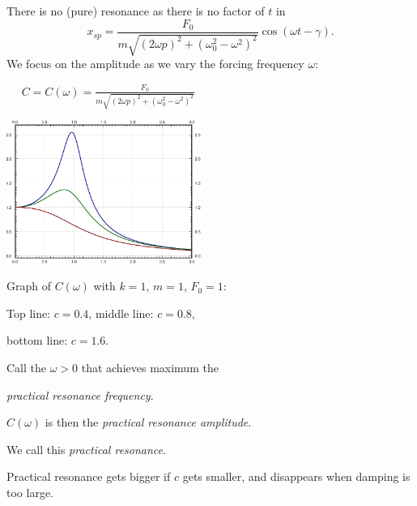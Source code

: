 \documentclass[10pt,aspectratio=169]{beamer}
\begin{document}
\begin{frame}
There is no (pure) resonance as there is no factor of $t$ in
\[
x_{sp} = 
\frac{F_0}{m \sqrt{{(2\omega p)}^2+{(\omega_0^2-\omega^2)}^2}} 
\cos ( \omega t - \gamma ) .
\]
\pause
We focus on the amplitude as we vary the forcing frequency $\omega$:

\medskip

~~
$\displaystyle
C = C(\omega) =
\frac{F_0}{m \sqrt{{(2\omega p)}^2+{(\omega_0^2-\omega^2)}^2}} 
$
\pause
\vspace*{-0.5in}

\hfill
\includegraphics[width=2.5in]{../figures/3-6-pracres}

\vspace*{-1.3in}

Graph of $C(\omega)$ with $k=1$, $m=1$, $F_0 = 1$:

Top line: $c=0.4$, \quad
middle line: $c=0.8$,

bottom line: $c=1.6$.

\medskip
\pause

Call the $\omega > 0$ that achieves maximum the

\emph{practical resonance frequency}.

\medskip
\pause

$C(\omega)$ is then the
\emph{practical resonance amplitude}.

\medskip
\pause

We call this \emph{practical resonance}.

\medskip

Practical resonance gets bigger if $c$ gets smaller,
and disappears when damping is too large.
\end{frame}
\end{document}
